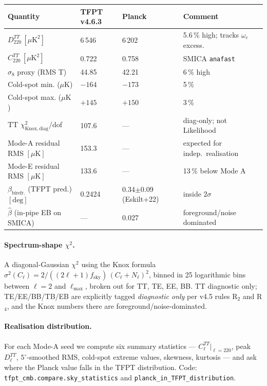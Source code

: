 \begin{center}
\renewcommand{\arraystretch}{1.18}
\begin{tabularx}{\textwidth}{@{}p{}p{}p{}Y@{}}
\toprule
\textbf{Quantity} & \textbf{TFPT v4.6.3} & \textbf{Planck} & \textbf{Comment} \\
\midrule
\(D_{220}^{TT}\,[\mu\mathrm{K}^2]\) & 6\,546 & 6\,202 & 5.6\,\% high; tracks \(\omega_c\) excess. \\
\(C_{220}^{TT}\,[\mu\mathrm{K}^2]\)  & 0.722 & 0.758 & SMICA \texttt{anafast} \\
\(\sigma_8\) proxy (RMS T) & 44.85 & 42.21 & 6\,\% high \\
Cold-spot min. (\(\mu\mathrm{K}\))& \(-164\) & \(-173\) & 5\,\% \\
Cold-spot max. (\(\mu\mathrm{K}\))& \(+145\) & \(+150\) & 3\,\% \\
TT \(\chi^2_{\mathrm{Knox,diag}}/\)dof & 107.6 & --- & diag-only; not Likelihood \\
Mode-A residual RMS \([\mu\mathrm{K}]\) & 153.3 & --- & expected for indep.\ realisation \\
Mode-E residual RMS \([\mu\mathrm{K}]\) & 133.6 & --- & 13\,\% below Mode A \\
\(\beta_{\mathrm{birefr.}}\) (TFPT pred.)\,\([\mathrm{deg}]\) & 0.2424 & 0.34\(\pm\)0.09 (Eskilt+22) & inside \(2\sigma\) \\
\(\hat\beta\) (in-pipe EB on SMICA) & --- & 0.027 & foreground/noise dominated \\
\bottomrule
\end{tabularx}
\end{center}

\paragraph{Spectrum-shape \(\chi^2\).} A diagonal-Gaussian \(\chi^2\)
using the Knox formula
\(\sigma^2(C_\ell)=2/((2\ell+1) f_{\mathrm{sky}})\,(C_\ell+N_\ell)^2\),
binned in 25 logarithmic bins between \(\ell=2\) and \(\ell_{\max}\),
broken out for TT, TE, EE, BB.  TT diagnostic only;
TE/EE/BB/TB/EB are explicitly tagged \emph{diagnostic only} per
v4.5 rules R\(_2\) and R\(_4\), and the Knox numbers there are
foreground/noise-dominated.

\paragraph{Realisation distribution.} For each Mode-A seed we compute
six summary statistics --- \(C_\ell^{TT}|_{\ell=220}\), peak
\(D_\ell^{TT}\), \(5^\circ\)-smoothed RMS, cold-spot extreme values,
skewness, kurtosis --- and ask where the Planck value falls in the
TFPT distribution. Code: \texttt{tfpt\_cmb.compare.sky\_statistics}
and \texttt{planck\_in\_TFPT\_distribution}.

